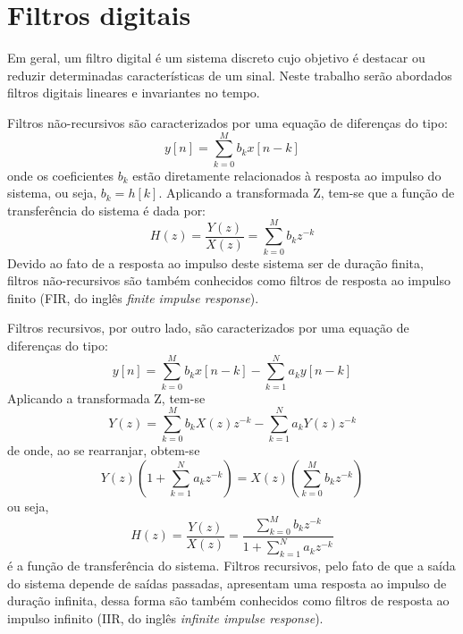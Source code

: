 \documentclass[12pt,a4paper]{report}
\begin{document}
\section{Filtros digitais}
  Em geral, um filtro digital é um sistema discreto cujo objetivo é destacar ou reduzir determinadas
  características de um sinal. Neste trabalho serão abordados filtros digitais lineares e invariantes no tempo.

  Filtros não-recursivos são caracterizados por uma equação de diferenças do tipo:
  \begin{equation}
    y[n] = \sum_{k = 0}^{M} b_k x[n - k]
  \end{equation}
  onde os coeficientes $b_k$ estão diretamente relacionados à resposta ao impulso do sistema, ou seja,
  $b_k = h[k]$. Aplicando a transformada Z, tem-se que a função de transferência do sistema é dada por:
  \begin{equation}
    H(z) = \frac{Y(z)}{X(z)} = \sum_{k = 0}^{M} b_k z^{-k}
  \end{equation}
  Devido ao fato de a resposta ao impulso deste sistema ser de duração finita, filtros não-recursivos são também
  conhecidos como filtros de resposta ao impulso finito (FIR, do inglês \textit{finite impulse response}).

  Filtros recursivos, por outro lado, são caracterizados por uma equação de diferenças do tipo:
  \begin{equation}
    y[n] = \sum_{k = 0}^{M} b_k x[n - k] - \sum_{k = 1}^{N} a_k y[n - k]
  \end{equation}
  Aplicando a transformada Z, tem-se
  \begin{equation}
    Y(z) = \sum_{k = 0}^{M} b_k X(z) z^{-k} - \sum_{k = 1}^{N} a_k Y(z) z^{-k}
  \end{equation}
  de onde, ao se rearranjar, obtem-se
  \begin{equation}
    Y(z) \left( 1 + \sum_{k = 1}^{N} a_k z^{-k} \right) = X(z) \left( \sum_{k = 0}^{M} b_k z^{-k} \right)
  \end{equation}
  ou seja,
  \begin{equation}
    H(z) = \frac{Y(z)}{X(z)} = \frac{\sum_{k = 0}^{M} b_k z^{-k}}{1 + \sum_{k = 1}^{N} a_k z^{-k}}
  \end{equation}
  é a função de transferência do sistema. Filtros recursivos, pelo fato de que a saída do sistema depende de
  saídas passadas, apresentam uma resposta ao impulso de duração infinita, dessa forma são também conhecidos como
  filtros de resposta ao impulso infinito (IIR, do inglês \textit{infinite impulse response}).
\end{document}
